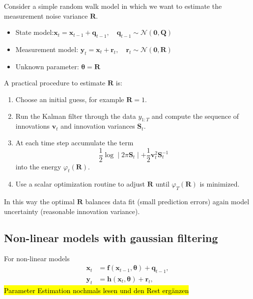 \begin{example}
    Consider a simple random walk model in which we want to estimate the measurement noise variance $\mathbf{R}$. 
    \begin{itemize}
        \item State model:$\mathbf{x}_t = \mathbf{x}_{t-1}+\mathbf{q}_{t-1}, \quad \mathbf{q}_{t-1} \sim \mathcal{N}(\mathbf{0},\mathbf{Q})$
        \item Measurement model: $\mathbf{y}_t= \mathbf{x}_t + \mathbf{r}_t, \quad \mathbf{r}_t \sim \mathcal{N}(\mathbf{0}, \mathbf{R})$
        \item Unknown parameter: $\boldsymbol{\theta} = \mathbf{R}$
    \end{itemize}
    A practical procedure to estimate $\mathbf{R}$ is: 
    \begin{enumerate}
        \item Choose an initial guess, for example $\mathbf{R}=1$.
        \item Run the Kalman filter through the data $y_{1:T}$ and compute the sequence of innovations $\mathbf{v}_t$ and innovation variances $\mathbf{S}_t$.
        \item At each time step accumulate the term 
        \[
        \frac{1}{2}\log  \mid 2\pi\mathbf{S}_t \mid  + \frac{1}{2}\mathbf{v}_t^2\mathbf{S}_t^{-1}
        \]
        into the energy $\varphi_t(\mathbf{R})$.
        \item Use a scalar optimization routine to adjust $\mathbf{R}$ until $\varphi_T(\mathbf{R})$ is minimized. 
    \end{enumerate}
In this way the optimal $\mathbf{R}$ balances data fit (small prediction errors) again model uncertainty (reasonable innovation variance). 
\end{example}

\subsection*{Non-linear models with gaussian filtering}
For non-linear models 
\begin{equation}
    \begin{aligned}
        \mathbf{x}_t &= \mathbf{f}(\mathbf{x}_{t-1},\boldsymbol{\theta}) + \mathbf{q}_{t-1},\\
        \mathbf{y}_t &= \mathbf{h}(\mathbf{x}_{t},\boldsymbol{\theta}) + \mathbf{r}_{t},
    \end{aligned}
\end{equation}
\hl{Parameter Estimation nochmals lesen und den Rest ergänzen}


